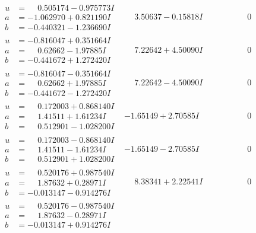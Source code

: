 \documentclass[1p]{elsarticle_modified}
\theoremstyle{definition}
\begin{document}
$$\begin{array}{c|c|c}
\begin{aligned}
u &= \phantom{-}0.505174 - 0.975773 I \\
a &= -1.062970 + 0.821190 I \\
b &= -0.440321 - 1.236690 I\end{aligned}
 & \phantom{-}3.50637 - 0.15818 I & \phantom{-0.000000 } 0 \\ \hline\begin{aligned}
u &= -0.816047 + 0.351664 I \\
a &= \phantom{-}0.62662 - 1.97885 I \\
b &= -0.441672 + 1.272420 I\end{aligned}
 & \phantom{-}7.22642 + 4.50090 I & \phantom{-0.000000 } 0 \\ \hline\begin{aligned}
u &= -0.816047 - 0.351664 I \\
a &= \phantom{-}0.62662 + 1.97885 I \\
b &= -0.441672 - 1.272420 I\end{aligned}
 & \phantom{-}7.22642 - 4.50090 I & \phantom{-0.000000 } 0 \\ \hline\begin{aligned}
u &= \phantom{-}0.172003 + 0.868140 I \\
a &= \phantom{-}1.41511 + 1.61234 I \\
b &= \phantom{-}0.512901 - 1.028200 I\end{aligned}
 & -1.65149 + 2.70585 I & \phantom{-0.000000 } 0 \\ \hline\begin{aligned}
u &= \phantom{-}0.172003 - 0.868140 I \\
a &= \phantom{-}1.41511 - 1.61234 I \\
b &= \phantom{-}0.512901 + 1.028200 I\end{aligned}
 & -1.65149 - 2.70585 I & \phantom{-0.000000 } 0 \\ \hline\begin{aligned}
u &= \phantom{-}0.520176 + 0.987540 I \\
a &= \phantom{-}1.87632 + 0.28971 I \\
b &= -0.013147 - 0.914276 I\end{aligned}
 & \phantom{-}8.38341 + 2.22541 I & \phantom{-0.000000 } 0 \\ \hline\begin{aligned}
u &= \phantom{-}0.520176 - 0.987540 I \\
a &= \phantom{-}1.87632 - 0.28971 I \\
b &= -0.013147 + 0.914276 I\end{aligned}

\end{array}$$
\end{document}
